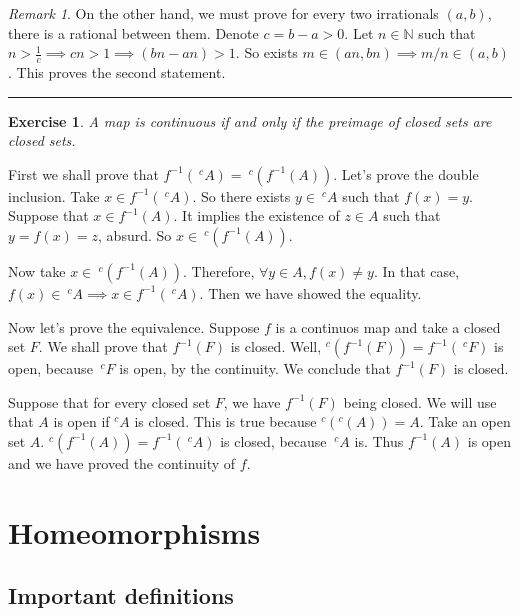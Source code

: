 \documentclass[a4paper,11pt]{article}
\newcommand{\linia}{\rule{\linewidth}{0.5pt}}
\theoremstyle{mytheor}
\theoremstyle{mytheor}
\newtheorem{exercise}{Exercise}
\theoremstyle{remark}
\newtheorem*{remark}{Remark}
\begin{document}
\begin{enumerate}
\begin{remark}
        On the other hand, we must prove for every two irrationals $(a,b)$,
        there is a rational between them. Denote $c = b - a > 0$. Let $n\in
        \mathbb{N}$ such that $n > \frac{1}{c} \implies cn > 1 \implies (bn -
        an) > 1$. So exists $m \in (an, bn) \implies m/n \in (a,b)$. This
        proves the second statement.   
    \end{remark}
\end{enumerate}

\noindent\linia

\begin{exercise}
    A map is continuous if and only if the preimage of closed sets are closed sets.
\end{exercise}

First we shall prove that $f^{-1}(~^cA) = ~^c(f^{-1}(A))$. Let's prove the
double inclusion. Take $x \in f^{-1}(~^cA)$. So there exists $y \in ~^cA$ such
that $f(x) = y$. Suppose that $x \in f^{-1}(A)$. It implies the existence of
$z \in A$ such that $y = f(x) = z$, absurd. So $x \in ~^c(f^{-1}(A))$.

Now take $x \in ~^c(f^{-1}(A))$. Therefore, $\forall y \in A, f(x) \neq y$. In
that case, $f(x) \in ~^cA \implies x \in f^{-1}(~^cA)$. Then we have showed
the equality. 

\vspace{5mm}

Now let's prove the equivalence. Suppose $f$ is a continuos map and take a
closed set $F$. We shall prove that $f^{-1}(F)$ is closed. Well, $^c(f^{-1}(F))
= f^{-1}(~^cF)$ is open, because $~^cF$ is open, by the continuity. We
conclude that $f^{-1}(F)$ is closed. 

Suppose that for every closed set $F$, we have $f^{-1}(F)$ being closed. We
will use that $A$ is open if $^cA$ is closed. This is true because $^c(^c(A))
= A$. Take an open set $A$. $^c(f^{-1}(A)) = f^{-1}(~^cA)$
is closed, because $~^cA$ is. Thus $f^{-1}(A)$ is open and we have proved the
continuity of $f$. 

\newpage

\section{Homeomorphisms}

\subsection{Important definitions}
\end{document}
